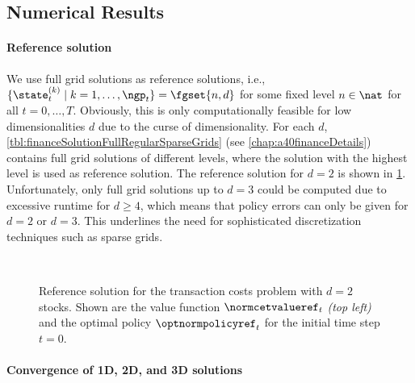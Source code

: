\subsection{Numerical Results}
\label{sec:842results}

\paragraph{Reference solution}

We use full grid solutions as reference solutions,
i.e., $\{\state_t^{(k)} \mid k = 1, \dotsc, \ngp_t\} = \fgset{n,d}$
for some fixed level $n \in \nat$ for all $t = 0, \dotsc, T$.
Obviously, this is only computationally feasible
for low dimensionalities $d$ due to the curse of dimensionality.
For each $d$,
\cref{tbl:financeSolutionFullRegularSparseGrids}
(see \cref{chap:a40financeDetails})
contains full grid solutions of different levels,
where the solution with the highest level is used as reference solution.
The reference solution for $d = 2$ is shown in
\cref{fig:financeSolution2DReference}.
Unfortunately, only full grid solutions up to $d = 3$ could be computed
due to excessive runtime for $d \ge 4$,
which means that policy errors can only be given for $d = 2$ or $d = 3$.
This underlines the need for sophisticated
discretization techniques such as sparse grids.

\begin{figure}
  \hfill%
  \hfill%
  \\[1mm]%
  \hfill%
  \hfill%
  \caption[Reference solution for the two-dimensional TCP]{%
    Reference solution for the transaction costs problem
    with $d = 2$ stocks.
    Shown are the value function $\normcetvalueref_t$ \emph{(top left)} and the
    optimal policy $\optnormpolicyref_t$ for the initial time step $t = 0$.%
  }%
  \label{fig:financeSolution2DReference}%
\end{figure}

\paragraph{Convergence of 1D, 2D, and 3D solutions}

